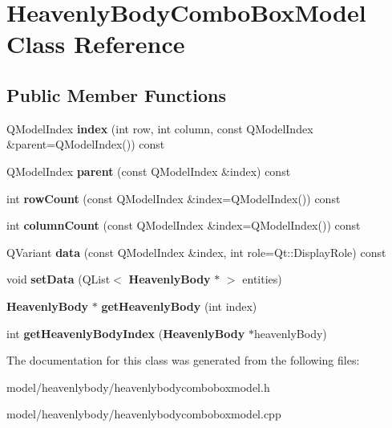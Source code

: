 \section{\-Heavenly\-Body\-Combo\-Box\-Model \-Class \-Reference}
\label{dd/d88/classHeavenlyBodyComboBoxModel}
\subsection*{\-Public \-Member \-Functions}
\begin{DoxyCompactItemize}
\item 
\-Q\-Model\-Index {\bfseries index} (int row, int column, const \-Q\-Model\-Index \&parent=\-Q\-Model\-Index()) const \label{dd/d88/classHeavenlyBodyComboBoxModel_aeb459de382f97296ffd4739a95bfd3eb}

\item 
\-Q\-Model\-Index {\bfseries parent} (const \-Q\-Model\-Index \&index) const \label{dd/d88/classHeavenlyBodyComboBoxModel_a8dc114dec8426c6e6264302470dab392}

\item 
int {\bfseries row\-Count} (const \-Q\-Model\-Index \&index=\-Q\-Model\-Index()) const \label{dd/d88/classHeavenlyBodyComboBoxModel_af9e833868b66e60566d27233529cc5ab}

\item 
int {\bfseries column\-Count} (const \-Q\-Model\-Index \&index=\-Q\-Model\-Index()) const \label{dd/d88/classHeavenlyBodyComboBoxModel_a5cf2c26b6129647b144880b1472b4436}

\item 
\-Q\-Variant {\bfseries data} (const \-Q\-Model\-Index \&index, int role=\-Qt\-::\-Display\-Role) const \label{dd/d88/classHeavenlyBodyComboBoxModel_ab32452909de0e4238d357fe183759583}

\item 
void {\bfseries set\-Data} (\-Q\-List$<$ {\bf \-Heavenly\-Body} $\ast$ $>$ entities)\label{dd/d88/classHeavenlyBodyComboBoxModel_a7d7afd44d28fc5fb9d7c99a2295f81e7}

\item 
{\bf \-Heavenly\-Body} $\ast$ {\bfseries get\-Heavenly\-Body} (int index)\label{dd/d88/classHeavenlyBodyComboBoxModel_a5ab4dae7941519612bcbcc7e1b6463eb}

\item 
int {\bfseries get\-Heavenly\-Body\-Index} ({\bf \-Heavenly\-Body} $\ast$heavenly\-Body)\label{dd/d88/classHeavenlyBodyComboBoxModel_ac57200d9257538babfdb200a0a661dd3}

\end{DoxyCompactItemize}


\-The documentation for this class was generated from the following files\-:\begin{DoxyCompactItemize}
\item 
model/heavenlybody/heavenlybodycomboboxmodel.\-h\item 
model/heavenlybody/heavenlybodycomboboxmodel.\-cpp\end{DoxyCompactItemize}

